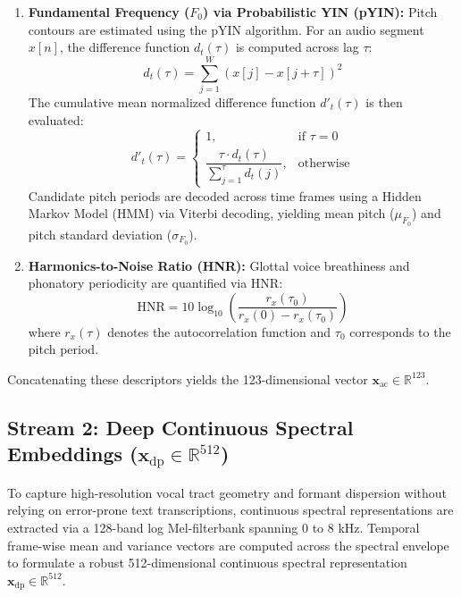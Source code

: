 \documentclass[conference]{IEEEtran}
\begin{document}
\begin{enumerate}
    \item \textbf{Fundamental Frequency ($F_0$) via Probabilistic YIN (pYIN):} Pitch contours are estimated using the pYIN algorithm. For an audio segment $x[n]$, the difference function $d_t(\tau)$ is computed across lag $\tau$:
    \begin{equation}
    d_t(\tau) = \sum_{j=1}^W (x[j] - x[j + \tau])^2
    \label{eq:pyin_diff}
    \end{equation}
    The cumulative mean normalized difference function $d'_t(\tau)$ is then evaluated:
    \begin{equation}
    d'_t(\tau) = \begin{cases}
    1, & \text{if } \tau = 0 \\
    \dfrac{\tau \cdot d_t(\tau)}{\sum_{j=1}^{\tau} d_t(j)}, & \text{otherwise}
    \end{cases}
    \label{eq:pyin_norm}
    \end{equation}
    Candidate pitch periods are decoded across time frames using a Hidden Markov Model (HMM) via Viterbi decoding, yielding mean pitch ($\mu_{F_0}$) and pitch standard deviation ($\sigma_{F_0}$).

    \item \textbf{Harmonics-to-Noise Ratio (HNR):} Glottal voice breathiness and phonatory periodicity are quantified via HNR:
    \begin{equation}
    \text{HNR} = 10 \log_{10} \left( \frac{r_x(\tau_0)}{r_x(0) - r_x(\tau_0)} \right)
    \label{eq:hnr}
    \end{equation}
    where $r_x(\tau)$ denotes the autocorrelation function and $\tau_0$ corresponds to the pitch period.
\end{enumerate}
Concatenating these descriptors yields the 123-dimensional vector $\mathbf{x}_{\text{ac}} \in \mathbb{R}^{123}$.

\subsection{Stream 2: Deep Continuous Spectral Embeddings ($\mathbf{x}_{\text{dp}} \in \mathbb{R}^{512}$)}
To capture high-resolution vocal tract geometry and formant dispersion without relying on error-prone text transcriptions, continuous spectral representations are extracted via a 128-band log Mel-filterbank spanning 0 to 8 kHz. Temporal frame-wise mean and variance vectors are computed across the spectral envelope to formulate a robust 512-dimensional continuous spectral representation $\mathbf{x}_{\text{dp}} \in \mathbb{R}^{512}$.
\end{document}

